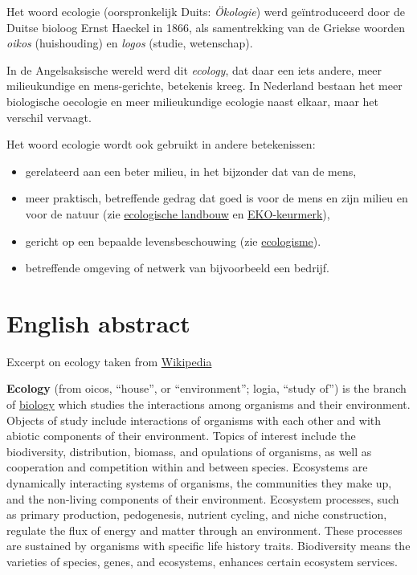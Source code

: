 \documentclass[twoside]{extreport}
\begin{document}
Het woord ecologie (oorspronkelijk Duits: \emph{Ökologie}) werd
geïntroduceerd door de Duitse bioloog Ernst Haeckel in 1866, als
samentrekking van de Griekse woorden \emph{oikos} (huishouding) en
\emph{logos} (studie, wetenschap).

In de Angelsaksische wereld werd dit \emph{ecology}, dat daar een iets
andere, meer milieukundige en mens-gerichte, betekenis kreeg. In
Nederland bestaan het meer biologische oecologie en meer milieukundige
ecologie naast elkaar, maar het verschil vervaagt.

Het woord ecologie wordt ook gebruikt in andere betekenissen:

\begin{itemize}
\tightlist
\item
  gerelateerd aan een beter milieu, in het bijzonder dat van de mens,
\item
  meer praktisch, betreffende gedrag dat goed is voor de mens en zijn
  milieu en voor de natuur (zie
  \href{https://nl.wikipedia.org/wiki/Ecologische_landbouw}{ecologische
  landbouw} en
  \href{https://nl.wikipedia.org/wiki/EKO-keurmerk}{EKO-keurmerk}),
\item
  gericht op een bepaalde levensbeschouwing (zie
  \href{https://nl.wikipedia.org/wiki/Ecologisme}{ecologisme}).
\item
  betreffende omgeving of netwerk van bijvoorbeeld een bedrijf.
\end{itemize}

\edutch

\benglish

\hypertarget{english-abstract}{%
\chapter*{English abstract}\label{english-abstract}}

Excerpt on ecology taken from
\href{https://en.wikipedia.org/wiki/Ecology}{Wikipedia}

\textbf{Ecology} (from oicos, ``house'', or ``environment''; logia,
``study of'') is the branch of
\href{http://www.dictionary.com/browse/ecology\%7Ctitle=the\%20definition\%20of\%20ecology\%7Cwebsite=Dictionary.com\%7Caccess-date=2018-02-20}{biology}
which studies the interactions among organisms and their environment.
Objects of study include interactions of organisms with each other and
with abiotic components of their environment. Topics of interest include
the biodiversity, distribution, biomass, and opulations of organisms, as
well as cooperation and competition within and between species.
Ecosystems are dynamically interacting systems of organisms, the
communities they make up, and the non-living components of their
environment. Ecosystem processes, such as primary production,
pedogenesis, nutrient cycling, and niche construction, regulate the flux
of energy and matter through an environment. These processes are
sustained by organisms with specific life history traits. Biodiversity
means the varieties of species, genes, and ecosystems, enhances certain
ecosystem services.
\end{document}

